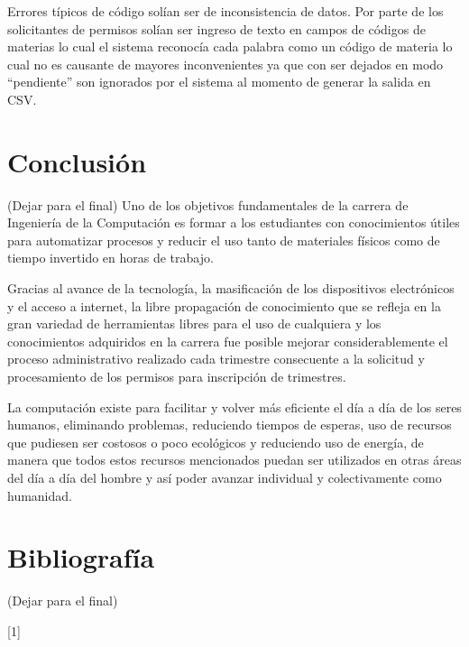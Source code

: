 \documentclass[]{article}
\begin{document}
Errores típicos de código solían ser de inconsistencia de datos. Por
parte de los solicitantes de permisos solían ser ingreso de texto en
campos de códigos de materias lo cual el sistema reconocía cada palabra
como un código de materia lo cual no es causante de mayores
inconvenientes ya que con ser dejados en modo ``pendiente'' son
ignorados por el sistema al momento de generar la salida en CSV.

\section{Conclusión}\label{conclusiuxf3n}

(Dejar para el final) Uno de los objetivos fundamentales de la carrera
de Ingeniería de la Computación es formar a los estudiantes con
conocimientos útiles para automatizar procesos y reducir el uso tanto de
materiales físicos como de tiempo invertido en horas de trabajo.

Gracias al avance de la tecnología, la masificación de los dispositivos
electrónicos y el acceso a internet, la libre propagación de
conocimiento que se refleja en la gran variedad de herramientas libres
para el uso de cualquiera y los conocimientos adquiridos en la carrera
fue posible mejorar considerablemente el proceso administrativo
realizado cada trimestre consecuente a la solicitud y procesamiento de
los permisos para inscripción de trimestres.

La computación existe para facilitar y volver más eficiente el día a día
de los seres humanos, eliminando problemas, reduciendo tiempos de
esperas, uso de recursos que pudiesen ser costosos o poco ecológicos y
reduciendo uso de energía, de manera que todos estos recursos
mencionados puedan ser utilizados en otras áreas del día a día del
hombre y así poder avanzar individual y colectivamente como humanidad.

\section{Bibliografía}\label{bibliografuxeda}

(Dejar para el final)

{[}1{]}
\end{document}
